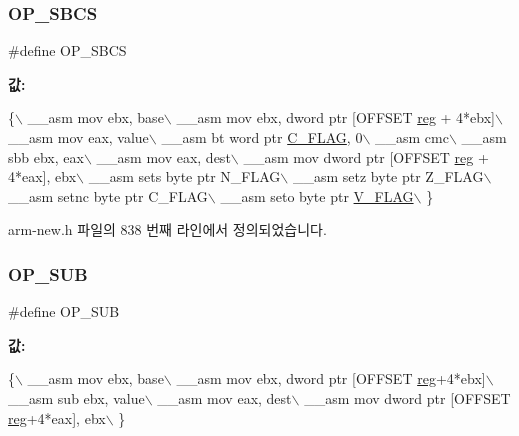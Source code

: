 \subsubsection{\texorpdfstring{O\+P\+\_\+\+S\+B\+CS}{OP\_SBCS}\hspace{0.1cm}{\footnotesize\ttfamily [2/2]}}
{\footnotesize\ttfamily \#define O\+P\+\_\+\+S\+B\+CS}

{\bfseries 값\+:}
\begin{DoxyCode}
\{\(\backslash\)
        \_\_asm mov ebx, base\(\backslash\)
        \_\_asm mov ebx, dword ptr [OFFSET \mbox{\hyperlink{_g_b_a_8h_ae29faba89509024ffd1a292badcedf2d}{reg}} + 4*ebx]\(\backslash\)
        \_\_asm mov eax, value\(\backslash\)
        \_\_asm bt word ptr \mbox{\hyperlink{_g_b_8h_aa29c80f7f7f901ec7a2c57887f56585d}{C\_FLAG}}, 0\(\backslash\)
        \_\_asm cmc\(\backslash\)
        \_\_asm sbb ebx, eax\(\backslash\)
        \_\_asm mov eax, dest\(\backslash\)
        \_\_asm mov dword ptr [OFFSET \mbox{\hyperlink{_g_b_a_8h_ae29faba89509024ffd1a292badcedf2d}{reg}} + 4*eax], ebx\(\backslash\)
        \_\_asm sets byte ptr N\_FLAG\(\backslash\)
        \_\_asm setz byte ptr Z\_FLAG\(\backslash\)
        \_\_asm setnc byte ptr C\_FLAG\(\backslash\)
        \_\_asm seto byte ptr \mbox{\hyperlink{_g_b_a_8h_a11a0e7b14a93be5eb2720b0151900919}{V\_FLAG}}\(\backslash\)
      \}
\end{DoxyCode}


arm-\/new.\+h 파일의 838 번째 라인에서 정의되었습니다.

\mbox{\label{_g_b_a_8cpp_abe4a72f7e3f753e7059bc2f2a01a0cfc}} 
\subsubsection{\texorpdfstring{O\+P\+\_\+\+S\+UB}{OP\_SUB}\hspace{0.1cm}{\footnotesize\ttfamily [1/2]}}
{\footnotesize\ttfamily \#define O\+P\+\_\+\+S\+UB}

{\bfseries 값\+:}
\begin{DoxyCode}
\{\(\backslash\)
        \_\_asm mov ebx, base\(\backslash\)
        \_\_asm mov ebx, dword ptr [OFFSET \mbox{\hyperlink{_g_b_a_8h_ae29faba89509024ffd1a292badcedf2d}{reg}}+4*ebx]\(\backslash\)
        \_\_asm sub ebx, value\(\backslash\)
        \_\_asm mov eax, dest\(\backslash\)
        \_\_asm mov dword ptr [OFFSET \mbox{\hyperlink{_g_b_a_8h_ae29faba89509024ffd1a292badcedf2d}{reg}}+4*eax], ebx\(\backslash\)
      \}
\end{DoxyCode}
\mbox{\label{arm-new_8h_abe4a72f7e3f753e7059bc2f2a01a0cfc}} 
